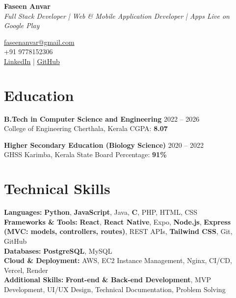 \documentclass[a4paper,11pt]{article}
\begin{document}
\noindent
\begin{minipage}[t]{0.55\textwidth}
    \vspace{0pt}
    {\Huge \textbf{Faseen Anvar}}\\[6pt]
    {\large \emph{Full Stack Developer \;|\; Web \& Mobile Application Developer \;| Apps Live on Google Play}}
\end{minipage}%
\begin{minipage}[t]{0.45\textwidth}
    \vspace{0pt}\raggedleft
    \href{mailto:faseenanvar@gmail.com}{faseenanvar@gmail.com}\\
    +91 9778152306\\
    \href{https://www.linkedin.com/in/faseen-anvar-09058a275}{LinkedIn} \;|\;
    \href{https://github.com/F-azy}{GitHub}
\end{minipage}

\section*{Education}

\noindent\textbf{B.Tech in Computer Science and Engineering} \hfill 2022 -- 2026\\
College of Engineering Cherthala, Kerala \hfill CGPA: \textbf{8.07}

\noindent\textbf{Higher Secondary Education (Biology Science)} \hfill 2020 -- 2022\\
GHSS Karimba, Kerala State Board \hfill Percentage: \textbf{91\%}

\section*{Technical Skills}
\noindent\textbf{Languages:} \textbf{Python}, \textbf{JavaScript}, Java, \textbf{C}, PHP, HTML, CSS \\
\noindent\textbf{Frameworks \& Tools:} \textbf{React}, \textbf{React Native}, Expo, \textbf{Node.js}, \textbf{Express (MVC: models, controllers, routes)}, REST APIs, \textbf{Tailwind CSS}, Git, GitHub \\
\noindent\textbf{Databases:} \textbf{PostgreSQL}, MySQL \\
\noindent\textbf{Cloud \& Deployment:} AWS, EC2 Instance Management, Nginx, CI/CD, Vercel, Render \\
\noindent\textbf{Additional Skills:} \textbf{Front-end \& Back-end Development}, MVP Development, {UI/UX Design}, Technical Documentation, Problem Solving
\end{document}
